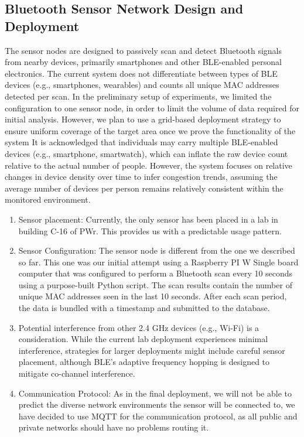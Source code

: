 \documentclass[runningheads]{llncs}
\begin{document}
\subsection{Bluetooth Sensor Network Design and Deployment}

The sensor nodes are designed to passively scan and detect Bluetooth signals from nearby devices, primarily smartphones and other BLE-enabled personal electronics.
The current system does not differentiate between types of BLE devices (e.g., smartphones, wearables) and counts all unique MAC addresses detected per scan.
In the preliminary setup of experiments, we limited the configuration to one sensor node, in order to limit the volume  of data required for initial analysis. However, we plan to use a grid-based deployment
strategy to ensure uniform coverage of the target area once we prove the functionality of the system
It is acknowledged that individuals may carry multiple BLE-enabled devices (e.g., smartphone, smartwatch), which can inflate the raw device count relative to the actual number of people. However, the system focuses on relative changes in device density over time to infer congestion trends, assuming the average number of devices per person remains relatively consistent within the monitored environment.
\begin{enumerate}
    \item Sensor placement: Currently, the only sensor has been placed in a lab in building C-16 of PWr. This provides us with a predictable usage pattern.
    \item Sensor Configuration: The sensor node is different from the one we described so far. This one was our initial attempt using a Raspberry PI W Single board computer that  was configured to perform a Bluetooth scan every 10 seconds using a purpose-built Python script. The scan results contain the number of unique MAC addresses seen in the last 10 seconds. After each scan period, the data is bundled with a timestamp and submitted to the database.
    \item Potential interference from other 2.4 GHz devices (e.g., Wi-Fi) is a consideration. While the current lab deployment experiences minimal interference, strategies for larger deployments might include careful sensor placement, although BLE's adaptive frequency hopping is designed to mitigate co-channel interference\cite{Bluetooth}.
    \item Communication Protocol: As in the final deployment, we will not be able to predict the diverse network environments the sensor will be connected to, we have decided to use MQTT for the communication protocol, as all public and private networks should have no problems routing it.
\end{enumerate}
\end{document}

